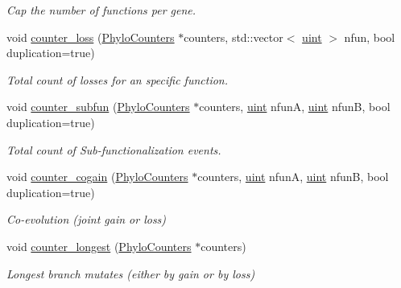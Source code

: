 \begin{Indent}
\begin{DoxyCompactItemize}
\begin{DoxyCompactList}\small\item\em Cap the number of functions per gene. \end{DoxyCompactList}\item 
void \hyperlink{namespacebarry_1_1counters_1_1phylo_affbd49d13928ece0a2f100261375d2a7}{counter\+\_\+loss} (\hyperlink{namespacebarry_1_1counters_1_1phylo_a4e401ffe66d04091343dcffaf915f8c3}{Phylo\+Counters} $\ast$counters, std\+::vector$<$ \hyperlink{namespacebarry_a11dfc53ddb4672278319aa04f1e09a6c}{uint} $>$ nfun, bool duplication=true)
\begin{DoxyCompactList}\small\item\em Total count of losses for an specific function. \end{DoxyCompactList}\item 
void \hyperlink{namespacebarry_1_1counters_1_1phylo_ad36131d4405a758fa200fd29932f49ea}{counter\+\_\+subfun} (\hyperlink{namespacebarry_1_1counters_1_1phylo_a4e401ffe66d04091343dcffaf915f8c3}{Phylo\+Counters} $\ast$counters, \hyperlink{namespacebarry_a11dfc53ddb4672278319aa04f1e09a6c}{uint} nfunA, \hyperlink{namespacebarry_a11dfc53ddb4672278319aa04f1e09a6c}{uint} nfunB, bool duplication=true)
\begin{DoxyCompactList}\small\item\em Total count of Sub-\/functionalization events. \end{DoxyCompactList}\item 
void \hyperlink{namespacebarry_1_1counters_1_1phylo_a002286f13261eb4633c6dc9e6fc1212b}{counter\+\_\+cogain} (\hyperlink{namespacebarry_1_1counters_1_1phylo_a4e401ffe66d04091343dcffaf915f8c3}{Phylo\+Counters} $\ast$counters, \hyperlink{namespacebarry_a11dfc53ddb4672278319aa04f1e09a6c}{uint} nfunA, \hyperlink{namespacebarry_a11dfc53ddb4672278319aa04f1e09a6c}{uint} nfunB, bool duplication=true)
\begin{DoxyCompactList}\small\item\em Co-\/evolution (joint gain or loss) \end{DoxyCompactList}\item 
void \hyperlink{namespacebarry_1_1counters_1_1phylo_ae4ace7c30011a6d7047a94fd0ddf2df2}{counter\+\_\+longest} (\hyperlink{namespacebarry_1_1counters_1_1phylo_a4e401ffe66d04091343dcffaf915f8c3}{Phylo\+Counters} $\ast$counters)
\begin{DoxyCompactList}\small\item\em Longest branch mutates (either by gain or by loss) \end{DoxyCompactList}\item 

\end{DoxyCompactItemize}
\end{Indent}
